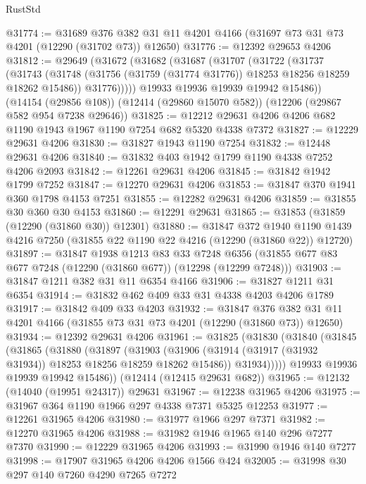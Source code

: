 \begin{lexlean}{RustStd}
\begin{coremodule}
{\begin{coremodule}
{{{{{{{{{{{{{{{{{{{{{{{{{{{{{{{{{{{{{{{{{{{{{{{{{{@31774 := @31689
    @376
    @382
    @31
    @11
    @4201
    @4166
    (@31697 @73 @31 @73 @4201 (@12290 (@31702 @73)) @12650)
@31776 := @12392 @29653 @4206
@31812 := @29649
    (@31672
      (@31682
        (@31687
          (@31707
            (@31722
              (@31737
                (@31743
                  (@31748 (@31756 (@31759 (@31774 @31776)) @18253 @18256 @18259 @18262 @15486))
                  @31776)))))
        @19933
        @19936
        @19939
        @19942
        @15486))
    (@14154 (@29856 @108))
    (@12414 (@29860 @15070 @582))
    (@12206 (@29867 @582 @954 @7238 @29646))
@31825 := @12212 @29631 @4206 @4206 @682 @1190 @1943 @1967 @1190 @7254 @682 @5320 @4338 @7372
@31827 := @12229 @29631 @4206
@31830 := @31827 @1943 @1190 @7254
@31832 := @12448 @29631 @4206
@31840 := @31832 @403 @1942 @1799 @1190 @4338 @7252 @4206 @2093
@31842 := @12261 @29631 @4206
@31845 := @31842 @1942 @1799 @7252
@31847 := @12270 @29631 @4206
@31853 := @31847 @370 @1941 @360 @1798 @4153 @7251
@31855 := @12282 @29631 @4206
@31859 := @31855 @30 @360 @30 @4153
@31860 := @12291 @29631
@31865 := @31853 (@31859 (@12290 (@31860 @30)) @12301)
@31880 := @31847
    @372
    @1940
    @1190
    @1439
    @4216
    @7250
    (@31855 @22 @1190 @22 @4216 (@12290 (@31860 @22)) @12720)
@31897 := @31847
    @1938
    @1213
    @83
    @33
    @7248
    @6356
    (@31855 @677 @83 @677 @7248 (@12290 (@31860 @677)) (@12298 (@12299 @7248)))
@31903 := @31847 @1211 @382 @31 @11 @6354 @4166
@31906 := @31827 @1211 @31 @6354
@31914 := @31832 @462 @409 @33 @31 @4338 @4203 @4206 @1789
@31917 := @31842 @409 @33 @4203
@31932 := @31847
    @376
    @382
    @31
    @11
    @4201
    @4166
    (@31855 @73 @31 @73 @4201 (@12290 (@31860 @73)) @12650)
@31934 := @12392 @29631 @4206
@31961 := @31825
    (@31830
      (@31840
        (@31845
          (@31865
            (@31880
              (@31897
                (@31903
                  (@31906 (@31914 (@31917 (@31932 @31934)) @18253 @18256 @18259 @18262 @15486))
                  @31934)))))
        @19933
        @19936
        @19939
        @19942
        @15486))
    (@12414 (@12415 @29631 @682))
@31965 := @12132 (@14040 (@19951 @24317)) @29631
@31967 := @12238 @31965 @4206
@31975 := @31967 @364 @1190 @1966 @297 @4338 @7371 @5325 @12253
@31977 := @12261 @31965 @4206
@31980 := @31977 @1966 @297 @7371
@31982 := @12270 @31965 @4206
@31988 := @31982 @1946 @1965 @140 @296 @7277 @7370
@31990 := @12229 @31965 @4206
@31993 := @31990 @1946 @140 @7277
@31998 := @17907 @31965 @4206 @4206 @1566 @424
@32005 := @31998 @30 @297 @140 @7260 @4290 @7265 @7272
}}}}}}}}}}}}}}}}}}}}}}}}}}}}}}}}}}}}}}}}}}}}}}}}}}
\end{coremodule}}
\end{coremodule}
\end{lexlean}
